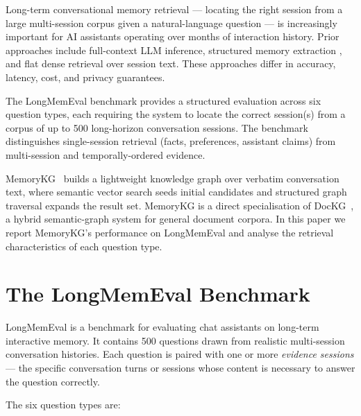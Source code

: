\documentclass[11pt,a4paper]{article}
\begin{document}
Long-term conversational memory retrieval --- locating the right session from
a large multi-session corpus given a natural-language question --- is
increasingly important for AI assistants operating over months of interaction history.
Prior approaches include full-context LLM inference, structured memory extraction
\citep{mem0}, and flat dense retrieval over session text.
These approaches differ in accuracy, latency, cost, and privacy guarantees.

The LongMemEval benchmark \citep{wang2024longmemeval} provides a structured
evaluation across six question types, each requiring the system to locate
the correct session(s) from a corpus of up to 500 long-horizon conversation
sessions.
The benchmark distinguishes single-session retrieval (facts, preferences,
assistant claims) from multi-session and temporally-ordered evidence.

MemoryKG~\citep{memorykg2026} builds a lightweight knowledge graph over verbatim
conversation text, where semantic vector search seeds initial candidates and
structured graph traversal expands the result set.
MemoryKG is a direct specialisation of DocKG~\citep{dockg2026}, a hybrid
semantic-graph system for general document corpora.
In this paper we report MemoryKG's performance on LongMemEval and analyse the
retrieval characteristics of each question type.

\section{The LongMemEval Benchmark}
\label{sec:benchmark}

LongMemEval \citep{wang2024longmemeval} is a benchmark for evaluating chat assistants
on long-term interactive memory.
It contains 500 questions drawn from realistic multi-session conversation histories.
Each question is paired with one or more \emph{evidence sessions} --- the specific
conversation turns or sessions whose content is necessary to answer the question
correctly.

The six question types are:
\end{document}
